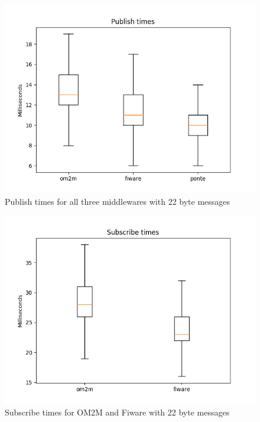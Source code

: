\documentclass[conference]{IEEEtran}
\begin{document}
\begin{figure}[htbp!]
  \centering
  \includegraphics[width=\columnwidth]{figures/om2m_fiware_ponte_publish_times.png}
  \caption{Publish times for all three middlewares with 22 byte messages}
  \label{fig:publish_times}
\end{figure}

\begin{figure}[htbp!]
  \centering
  \includegraphics[width=\columnwidth]{figures/om2m_fiware_subscribe_times.png}
  \caption{Subscribe times for OM2M and Fiware with 22 byte messages}
  \label{fig:subscribe_times}
\end{figure}
\end{document}
